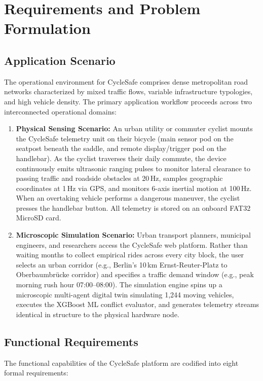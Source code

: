 \chapter{Requirements and Problem Formulation}
\label{chap:requirements}

\section{Application Scenario}
The operational environment for CycleSafe comprises dense metropolitan road networks characterized by mixed traffic flows, variable infrastructure typologies, and high vehicle density. The primary application workflow proceeds across two interconnected operational domains:

\begin{enumerate}
    \item \textbf{Physical Sensing Scenario:} An urban utility or commuter cyclist mounts the CycleSafe telemetry unit on their bicycle (main sensor pod on the seatpost beneath the saddle, and remote display/trigger pod on the handlebar). As the cyclist traverses their daily commute, the device continuously emits ultrasonic ranging pulses to monitor lateral clearance to passing traffic and roadside obstacles at 20\,Hz, samples geographic coordinates at 1\,Hz via GPS, and monitors 6-axis inertial motion at 100\,Hz. When an overtaking vehicle performs a dangerous maneuver, the cyclist presses the handlebar button. All telemetry is stored on an onboard FAT32 MicroSD card.
    \item \textbf{Microscopic Simulation Scenario:} Urban transport planners, municipal engineers, and researchers access the CycleSafe web platform. Rather than waiting months to collect empirical rides across every city block, the user selects an urban corridor (e.g., Berlin's 10\,km Ernst-Reuter-Platz to Oberbaumbr{\"u}cke corridor) and specifies a traffic demand window (e.g., peak morning rush hour 07:00--08:00). The simulation engine spins up a microscopic multi-agent digital twin simulating 1,244 moving vehicles, executes the XGBoost ML conflict evaluator, and generates telemetry streams identical in structure to the physical hardware node.
\end{enumerate}

\section{Functional Requirements}
The functional capabilities of the CycleSafe platform are codified into eight formal requirements:

